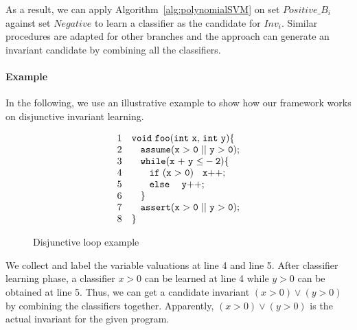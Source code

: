 As a result, we can apply Algorithm~\ref{alg:polynomialSVM} on set $\mathit{Positive\_B_i}$ against set $\mathit{Negative}$ to learn a classifier as the candidate for $Inv_i$.
Similar procedures are adapted for other branches and the approach can generate an invariant candidate by combining all the classifiers.

\paragraph{Example}
In the following, we use an illustrative example to show how our framework works on disjunctive invariant learning.

\begin{figure}%
    \raggedright
     \vspace{-0.2cm} \[
      \begin{array}{ll}
      1 & \code{void~foo(int ~x{,} ~int~y)\{} \\
      2 & \code{~~~ assume(x~{>}~0~ {||} ~y~{>}~0);}  \\
      3 & \code{~~~ while(x~{+}~y~{\le}-2)\{}  \\
      4 & \code{~~~ \quad if~(x~{>}~0) ~~~x{++};}  \\
      5 & \code{~~~ \quad else~ ~~~y{++};}\\
      6 & \code{~~~\}} \\
      7 & \code{~~~assert(x~{>}~0~ {||} ~y~{>}~0);}\\
      8 & \}
      \end{array}
    \]
\caption{Disjunctive loop example}
\label{fig:disjunctive:example}
\end{figure}
We collect and label the variable valuations at line 4 and line 5.
After classifier learning phase, a classifier $x>0$ can be learned at line 4 while $y>0$ can be obtained at line 5.
Thus, we can get a candidate invariant $(x>0) \vee (y>0)$ by combining the classifiers together.
Apparently, $(x>0) \vee (y>0)$ is the actual invariant for the given program.

